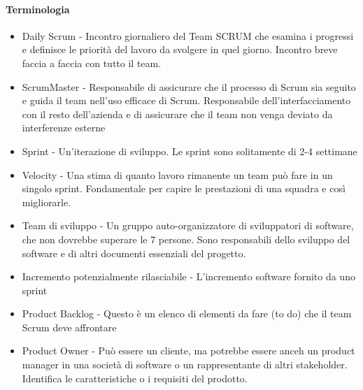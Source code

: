 \paragraph*{Terminologia}
\begin{itemize}
    \item Daily Scrum - Incontro giornaliero del Team SCRUM che esamina i progressi e definisce
    le priorità del lavoro da svolgere in quel giorno. Incontro breve faccia a faccia con tutto il team.
    \item ScrumMaster - Responsabile di assicurare che il processo di Scrum sia seguito e guida il team
    nell'uso efficace di Scrum. Responsabile dell'interfacciamento con il resto dell'azienda e di
    assicurare che il team non venga deviato da interferenze esterne
    \item Sprint - Un'iterazione di sviluppo. Le sprint sono solitamente di 2-4 settimane
    \item Velocity - Una stima di quanto lavoro rimanente un team può fare in un
    singolo sprint. Fondamentale per capire le prestazioni di una squadra e così
    migliorarle.
    \item Team di sviluppo - Un gruppo auto-organizzatore di sviluppatori di software,
    che non dovrebbe superare le 7 persone. Sono responsabili dello sviluppo del software e
    di altri documenti essenziali del progetto.
    \item Incremento potenzialmente rilasciabile - L'incremento software fornito da uno sprint
    \item Product Backlog - Questo è un elenco di elementi da fare (to do) che il team Scrum
    deve affrontare
    \item Product Owner - Può essere un cliente, ma potrebbe essere anceh un product manager
    in una società di software o un rappresentante di altri stakeholder. Identifica
    le caratteristiche o i requisiti del prodotto.
\end{itemize}

